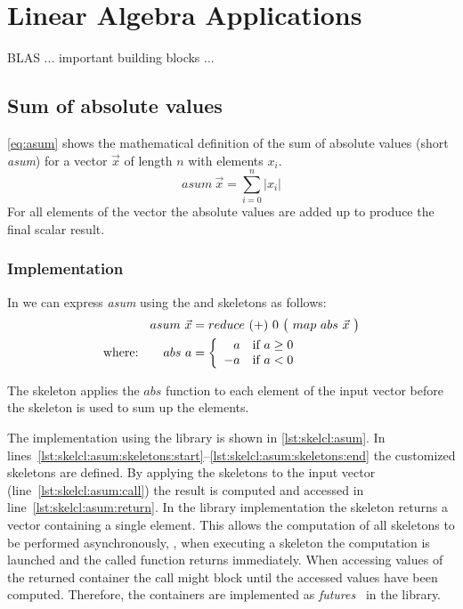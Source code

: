 \section{Linear Algebra Applications}

BLAS ... important building blocks ...

\subsection{Sum of absolute values}
\label{sec:asum}
\autoref{eq:asum} shows the mathematical definition of the sum of absolute values (short \emph{asum}) for a vector $\vec{x}$ of length $n$ with elements $x_i$.
\begin{equation}
  asum\ \vec{x} = \sum_{i=0}^{n} | x_i |
  \label{eq:asum}
\end{equation}
For all elements of the vector the absolute values are added up to produce the final scalar result.

\subsubsection*{\SkelCL Implementation}
In \SkelCL we can express \emph{asum} using the \map and \reduce skeletons as follows:
\begin{align}
  asum\ \vec{x} &= reduce\ (+)\ 0\ \big(\ map\ abs\ \vec{x}\ \big)\\
  \text{where:} \qquad abs\ a &=
    \left\{
      \begin{array}{r l}
      a & \text{if } a \geq 0\\
      -a & \text{if } a < 0
      \end{array}
    \right.\nonumber
\end{align}

The \map skeleton applies the $abs$ function to each element of the input vector before the \reduce skeleton is used to sum up the elements.

The implementation using the \SkelCL library is shown in \autoref{lst:skelcl:asum}.
In lines~\ref{lst:skelcl:asum:skeletons:start}--\ref{lst:skelcl:asum:skeletons:end} the customized skeletons are defined.
By applying the skeletons to the input vector (line~\ref{lst:skelcl:asum:call}) the result is computed and accessed in line~\ref{lst:skelcl:asum:return}.
In the \SkelCL library implementation the \reduce skeleton returns a vector containing a single element.
This allows the computation of all skeletons to be performed asynchronously, \ie, when executing a skeleton the computation is launched and the called function returns immediately.
When accessing values of the returned container the call might block until the accessed values have been computed.
Therefore, the containers are implemented as \emph{futures}~\cite{HewittBa1977,FriedmanWi1978} in the \SkelCL library.

